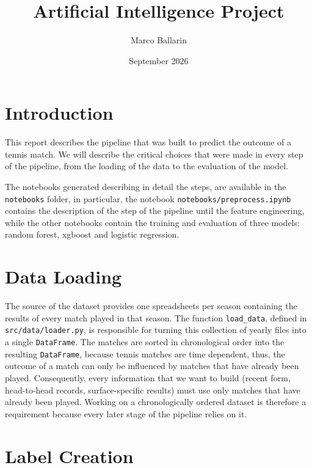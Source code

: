 \documentclass{article}
\title{Artificial Intelligence Project}
\author{Marco Ballarin}
\date{September 2026}
\begin{document}
\maketitle
\thispagestyle{empty} %



\newpage

\section{Introduction}

This report describes the pipeline that was built to predict the outcome of a tennis match.
We will describe the critical choices that were made in every step of the pipeline, from the loading of
the data to the evaluation of the model.

The notebooks generated describing in detail the steps, are available in the \texttt{notebooks} folder, in particular,
the notebook \texttt{notebooks/preprocess.ipynb} contains the description of the step of the pipeline until
the feature engineering, while the other notebooks contain the training and evaluation of three models:
random forest, xgboost and logistic regression.

\section{Data Loading}

The source of the dataset provides one spreadsheets per season containing the results of every match
played in that season. The function \texttt{load\_data}, defined in
\texttt{src/data/loader.py}, is responsible for turning this collection of yearly files into a single
\texttt{DataFrame}. The matches are sorted in chronological order into the resulting \texttt{DataFrame},
 because tennis matches are
time dependent, thus, the outcome of a match can only be influenced by matches that have already been
 played. Consequently,
every information that we want to build (recent form, head-to-head records, surface-specific results) 
must use only matches that have already been played. 
Working on a chronologically ordered dataset is therefore a
requirement because every later stage of the pipeline relies on it.

\section{Label Creation}
\end{document}
